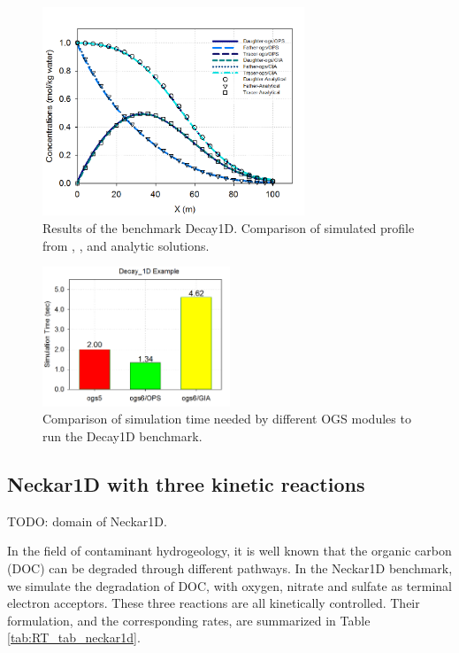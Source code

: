 \begin{figure}
\includegraphics[width=0.7\textwidth]{RT/figs/RT_fig_decay1d_results}
\caption{Results of the benchmark Decay1D. Comparison of simulated profile from , , and analytic solutions. }
\label{fig:RT_fig_decay1d_results}
\end{figure}

\begin{figure}
\includegraphics[width=0.5\textwidth]{RT/figs/RT_fig_decay1d_performance}
\caption{Comparison of simulation time needed by different OGS modules to run the Decay1D benchmark. }
\label{fig:RT_fig_decay1d_performance}
\end{figure}

\subsection{Neckar1D with three kinetic reactions}

TODO: domain of Neckar1D. 

In the field of contaminant hydrogeology, it is well known that the organic carbon (DOC) can be degraded through different pathways. In the Neckar1D benchmark, we simulate the degradation of DOC, with oxygen, nitrate and sulfate as terminal electron acceptors. These three reactions are all kinetically controlled. Their formulation, and the corresponding rates, are summarized in Table \ref{tab:RT_tab_neckar1d}. 

